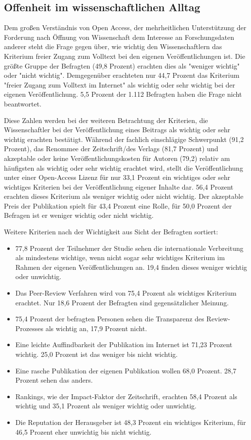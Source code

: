 \subsection{Offenheit im wissenschaftlichen Alltag}

Dem großen Verständnis von Open Access, der mehrheitlichen Unterstützung der Forderung nach Öffnung von Wissenschaft dem Interesse an Forschungsdaten anderer steht die Frage gegen über, wie wichtig den Wissenschaftlern das Kriterium freier Zugang zum Volltext bei den eigenen Veröffentlichungen ist. Die größte Gruppe der Befragten (49,8 Prozent) erachten dies als "weniger wichtig" oder "nicht wichtig". Demgegenüber erachteten nur 44,7 Prozent das Kriterium "freier Zugang zum Volltext im Internet" als wichtig oder sehr wichtig bei der eigenen Veröffentlichung. 5,5 Prozent der 1.112 Befragten haben die Frage nicht beantwortet.

Diese Zahlen werden bei der weiteren Betrachtung der Kriterien, die Wissenschaftler bei der Veröffentlichung eines Beitrags als wichtig oder sehr wichtig erachten bestätigt. Während der fachlich einschlägige Schwerpunkt (91,2 Prozent), das Renommee der Zeitschrift/des Verlags (81,7 Prozent) und akzeptable oder keine Veröffentlichungskosten für Autoren (79,2) relativ am häufigsten als wichtig oder sehr wichtig erachtet wird, stellt die Veröffentlichung unter einer Open-Access Lizenz für nur 33,1 Prozent ein wichtiges oder sehr wichtiges Kriterien bei der Veröffentlichung eigener Inhalte dar. 56,4 Prozent erachten dieses Kriterium als weniger wichtig oder nicht wichtig. Der akzeptable Preis der Publikation spielt für 43,4 Prozent eine Rolle, für 50,0 Prozent der Befragen ist er weniger wichtig oder nicht wichtig.

Weitere Kriterien nach der Wichtigkeit aus Sicht der Befragten sortiert:
\begin{itemize}
\item 77,8 Prozent der Teilnehmer der Studie sehen die internationale Verbreitung als mindestens wichtige, wenn nicht sogar sehr wichtiges Kriterium im Rahmen der eigenen Veröffentlichungen an. 19,4 finden dieses weniger wichtig oder unwichtig.
\item Das Peer-Review Verfahren wird von 75,4 Prozent als wichtiges Kriterium erachtet. Nur 18,6 Prozent der Befragten sind gegensätzlicher Meinung.
\item 75,4 Prozent der befragten Personen sehen die Transparenz des Review-Prozesses als wichtig an, 17,9 Prozent nicht.
\item Eine leichte Auffindbarkeit der Publikation im Internet ist 71,23 Prozent wichtig. 25,0 Prozent ist das weniger bis nicht wichtig.
\item Eine rasche Publikation der eigenen Publikation wollen 68,0 Prozent. 28,7 Prozent sehen das anders.
\item Rankings, wie der Impact-Faktor der Zeitschrift, erachten 58,4 Prozent als wichtig und 35,1 Prozent als weniger wichtig oder unwichtig.
\item Die Reputation der Herausgeber ist 48,3 Prozent ein wichtiges Kriterium, für 46,5 Prozent eher unwichtig bis nicht wichtig.
\end{itemize}

